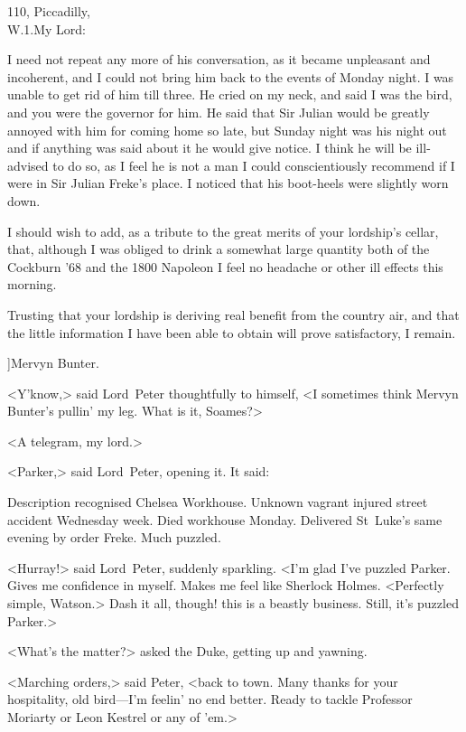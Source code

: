 \begin{mail}{110, Piccadilly,\\W\@.1.}{My Lord:}
\begin{dialogue}
\end{dialogue}

I need not repeat any more of his conversation, as it became unpleasant and incoherent, and I could not bring him back to the events of Monday night. I was unable to get rid of him till three. He cried on my neck, and said I was the bird, and you were the governor for him. He said that Sir Julian would be greatly annoyed with him for coming home so late, but Sunday night was his night out and if anything was said about it he would give notice. I think he will be ill-advised to do so, as I feel he is not a man I could conscientiously recommend if I were in Sir Julian Freke's place. I noticed that his boot-heels were slightly worn down.

I should wish to add, as a tribute to the great merits of your lordship's cellar, that, although I was obliged to drink a somewhat large quantity both of the Cockburn '68 and the 1800 Napoleon I feel no headache or other ill effects this morning.

Trusting that your lordship is deriving real benefit from the country air, and that the little information I have been able to obtain will prove satisfactory, I remain.

]{Mervyn Bunter.}
\end{mail}

<Y'know,> said Lord~Peter thoughtfully to himself, <I sometimes think Mervyn Bunter's pullin' my leg. What is it, Soames?>

<A telegram, my lord.>

<Parker,> said Lord~Peter, opening it. It said:

\begin{telegram}[Parker]
	Description recognised Chelsea Workhouse. Unknown vagrant injured street accident Wednesday week. Died workhouse Monday. Delivered St~Luke's same evening by order Freke. Much puzzled.
\end{telegram}

<Hurray!> said Lord~Peter, suddenly sparkling. <I'm glad I've puzzled Parker. Gives me confidence in myself. Makes me feel like Sherlock Holmes. <Perfectly simple, Watson.> Dash it all, though! this is a beastly business. Still, it's puzzled Parker.>

<What's the matter?> asked the Duke, getting up and yawning.

<Marching orders,> said Peter, <back to town. Many thanks for your hospitality, old bird—I'm feelin' no end better. Ready to tackle Professor Moriarty or Leon Kestrel or any of 'em.>

